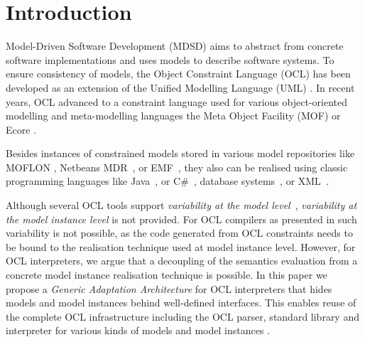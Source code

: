 \section{Introduction}
	
	Model-Driven Software Development (MDSD) aims to abstract from concrete 
	software implementations and uses models to describe software systems. 
	To ensure consistency of models, the Object Constraint Language 
	(OCL) \cite{spec:OCL2-2} has been developed as an extension of the Unified 
	Modelling Language (UML) \cite{spec:UML2-2}\cite{warmer:ocl}. In recent years,
	OCL advanced to a constraint language used for various object-oriented
	modelling  and meta-modelling languages \cite{detaching}  the Meta
	Object Facility (MOF) \cite{UmlMof} or Ecore \cite{WWW:MDT}.

	 Besides instances of constrained models stored in various model repositories
	like MOFLON \cite{MOFLON}, Netbeans MDR~\cite{UmlMof}, or EMF~\cite{WWW:MDT},
	they also can be realised using classic programming languages like
	Java~\cite{demuthRGWS09}, or C\#~\cite{OCLCsharp}, database systems~\cite{OCLRelDB}, or XML~\cite{OCLXML}. 
	
	Although several OCL tools support \emph{variability at the model level}~\cite{braeuerOCL07}\cite{akehurst2003ocl}, \emph{variability at the model
	instance level} is not provided. 
	For OCL compilers as presented in
	\cite{UmlMof,demuthRGWS09,OCLCsharp,OCLRelDB} 
	such variability is not possible, as the code generated from OCL constraints 
	needs to be	bound to the realisation technique used at model instance
	level. 
	However, for OCL interpreters, we argue that a
	decoupling of the semantics evaluation from a concrete model instance realisation technique is possible.
	In this paper we propose a \emph{Generic Adaptation Architecture} for OCL
	interpreters that hides models and model instances behind well-defined
	interfaces. This enables reuse of the complete OCL infrastructure including the OCL parser, 
	standard library and interpreter for various kinds of models and model instances .
	
